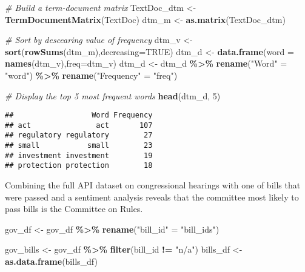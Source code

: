 \documentclass[]{article}
\newenvironment{Shaded}{\begin{snugshade}}{\end{snugshade}}
\newcommand{\CommentTok}[1]{\textcolor[rgb]{0.56,0.35,0.01}{\textit{#1}}}
\newcommand{\DataTypeTok}[1]{\textcolor[rgb]{0.13,0.29,0.53}{#1}}
\newcommand{\DecValTok}[1]{\textcolor[rgb]{0.00,0.00,0.81}{#1}}
\newcommand{\KeywordTok}[1]{\textcolor[rgb]{0.13,0.29,0.53}{\textbf{#1}}}
\newcommand{\NormalTok}[1]{#1}
\newcommand{\OperatorTok}[1]{\textcolor[rgb]{0.81,0.36,0.00}{\textbf{#1}}}
\newcommand{\OtherTok}[1]{\textcolor[rgb]{0.56,0.35,0.01}{#1}}
\newcommand{\StringTok}[1]{\textcolor[rgb]{0.31,0.60,0.02}{#1}}
\begin{document}
\begin{Shaded}
\begin{Highlighting}[]
\CommentTok{\# Build a term{-}document matrix}
\NormalTok{TextDoc\_dtm \textless{}{-}}\StringTok{ }\KeywordTok{TermDocumentMatrix}\NormalTok{(TextDoc)}
\NormalTok{dtm\_m \textless{}{-}}\StringTok{ }\KeywordTok{as.matrix}\NormalTok{(TextDoc\_dtm)}

\CommentTok{\# Sort by descearing value of frequency}
\NormalTok{dtm\_v \textless{}{-}}\StringTok{ }\KeywordTok{sort}\NormalTok{(}\KeywordTok{rowSums}\NormalTok{(dtm\_m),}\DataTypeTok{decreasing=}\OtherTok{TRUE}\NormalTok{)}
\NormalTok{dtm\_d \textless{}{-}}\StringTok{ }\KeywordTok{data.frame}\NormalTok{(}\DataTypeTok{word =} \KeywordTok{names}\NormalTok{(dtm\_v),}\DataTypeTok{freq=}\NormalTok{dtm\_v)}
\NormalTok{dtm\_d \textless{}{-}}\StringTok{ }\NormalTok{dtm\_d }\OperatorTok{\%\textgreater{}\%}
\StringTok{  }\KeywordTok{rename}\NormalTok{(}\StringTok{"Word"}\NormalTok{ =}\StringTok{ "word"}\NormalTok{) }\OperatorTok{\%\textgreater{}\%}
\StringTok{  }\KeywordTok{rename}\NormalTok{(}\StringTok{"Frequency"}\NormalTok{ =}\StringTok{ "freq"}\NormalTok{)}

\CommentTok{\# Display the top 5 most frequent words}
\KeywordTok{head}\NormalTok{(dtm\_d, }\DecValTok{5}\NormalTok{)}
\end{Highlighting}
\end{Shaded}

\begin{verbatim}
##                  Word Frequency
## act               act       107
## regulatory regulatory        27
## small           small        23
## investment investment        19
## protection protection        18
\end{verbatim}

Combining the full API dataset on congressional hearings with one of
bills that were passed and a sentiment analysis reveals that the
committee most likely to pass bills is the Committee on Rules.

\begin{Shaded}
\begin{Highlighting}[]
\NormalTok{gov\_df \textless{}{-}}\StringTok{ }\NormalTok{gov\_df }\OperatorTok{\%\textgreater{}\%}
\StringTok{  }\KeywordTok{rename}\NormalTok{(}\StringTok{"bill\_id"}\NormalTok{ =}\StringTok{ "bill\_ids"}\NormalTok{)}

\NormalTok{gov\_bills \textless{}{-}}\StringTok{ }\NormalTok{gov\_df }\OperatorTok{\%\textgreater{}\%}\StringTok{ }\KeywordTok{filter}\NormalTok{(bill\_id }\OperatorTok{!=}\StringTok{ "n/a"}\NormalTok{)}
\NormalTok{bills\_df \textless{}{-}}\StringTok{ }\KeywordTok{as.data.frame}\NormalTok{(bills\_df)}
\end{Highlighting}
\end{Shaded}
\end{document}
